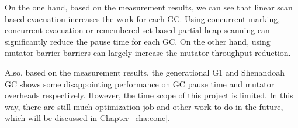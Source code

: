 On the one hand, based on the measurement results, we can see that linear scan based evacuation
increases the work for each GC. Using concurrent marking, concurrent evacuation
or remembered set based partial heap scanning can significantly reduce the pause time
for each GC. On the other hand, using mutator barrier barriers can largely increase the
mutator throughput reduction.

Also, based on the measurement results, the generational G1 and Shenandoah GC shows some
disappointing performance on GC pause time and mutator overheads respectively.
However, the time scope of this project is limited.
In this way, there are still much optimization job and other work to do in the future,
which will be discussed in Chapter~\ref{cha:conc}.







%   

%       

%       

